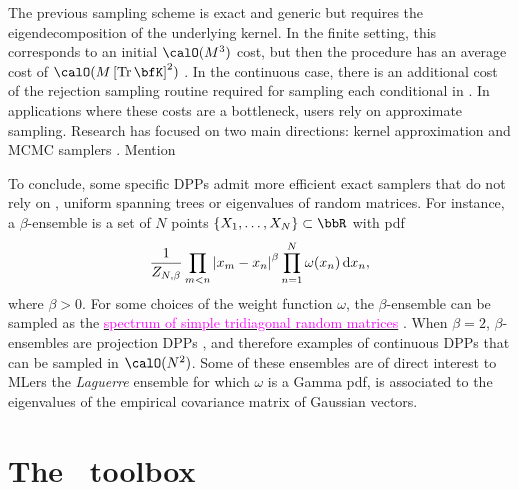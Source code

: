 \documentclass[twoside,11pt]{article}
\begin{document}
          The previous sampling scheme is exact and generic but requires the eigendecomposition of the underlying kernel.
          In the finite setting, this corresponds to an initial $\calO(M^3)$ cost, but then the procedure has an average cost of $\calO(M\lrb{\Tr \bfK}^2)$
          \citep{TrBaAm18}.
          In the continuous case, there is an additional cost of the rejection sampling routine required for sampling each conditional in .
          In applications where these costs are a bottleneck, users rely on approximate sampling.
          Research has focused on two main directions: kernel approximation \citep{AKFT13} and MCMC samplers \citep{AnGhRe16, LiJeSr16c, GaBaVa17}.
          Mention \citep{Pou19,DeCaVa19}

          To conclude, some specific DPPs admit more efficient exact samplers that do not rely on , \eg uniform spanning trees \citep{PrWi98} or eigenvalues of random matrices.
          For instance, a $\beta$-ensemble is a set of $N$ points $\{X_1,\dots,X_N\}\subset \bbR$ with pdf
          \begin{equation*}
          \label{eq:beta_ensemble_pdf}
            \frac{1}{Z_{N,\beta}}
            \prod_{m< n}
                \left| x_m-x_n \right|^{\beta}
            \prod_{n= 1}^N
                \omega(x_n)
                \mathop{}\!\mathrm{d} x_n,
          \end{equation*}
          where $\beta>0$.
          For some choices of the weight function $\omega$, the $\beta$-ensemble can be sampled as the \href{https://dppy.readthedocs.io/en/latest/continuous_dpps/beta_ensembles.banded_models.html}{\textcolor{magenta}{spectrum of simple tridiagonal random matrices}} \citep{DuEd02,KiNe04}.
          When $\beta=2$, $\beta$-ensembles are projection DPPs \citep{Kon05}, and therefore examples of continuous DPPs that can be sampled in $\calO(N^2)$.
          Some of these ensembles are of direct interest to MLers \eg the \emph{Laguerre} ensemble for which $\omega$ is a Gamma pdf, is associated to the eigenvalues of the empirical covariance matrix of \iid Gaussian vectors.



\section{The \DPPy\ toolbox} %
\label{sec:the_dppy_toolbox}
\end{document}
